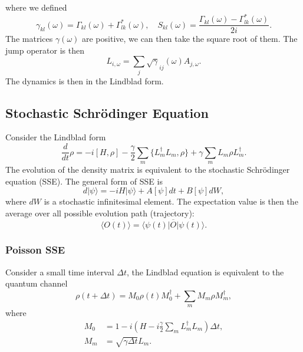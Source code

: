 \documentclass[aps,prb,superscriptaddress,nofootinbib]{revtex4}
\begin{document}
where we defined
\begin{equation}
	\gamma_{kl}(\omega) = \Gamma_{kl}(\omega) +\Gamma^*_{lk}(\omega), \quad
	S_{kl}(\omega) = \frac{\Gamma_{kl}(\omega) - \Gamma^*_{lk}(\omega)}{2i}.
\end{equation}
The matrices $\gamma(\omega)$ are positive, we can then take the square root of them.
The jump operator is then
\begin{equation}
	L_{i,\omega} = \sum_j \sqrt{\gamma}_{ij}(\omega)A_{j,\omega}.
\end{equation}
The dynamics is then in the Lindblad form.


\subsection{Stochastic Schr\"{o}dinger Equation}

Consider the Lindblad form
\begin{equation}
	\frac{d}{dt}\rho = -i[H,\rho] -\frac{\gamma}{2}\sum_m \{L_m^\dagger L_m, \rho\} + \gamma\sum_m L_m\rho L_m^\dagger.
\end{equation}
The evolution of the density matrix is equivalent to the stochastic Schr\"{o}dinger equation (SSE).
The general form of SSE is
\begin{equation}
	d|\psi\rangle = -iH|\psi\rangle + A[\psi]dt + B[\psi]dW,
\end{equation}
where $dW$ is a stochastic infinitesimal element.
The expectation value is then the average over all possible evolution path (trajectory):
\begin{equation}
	\langle O(t) \rangle = \overline{\langle\psi(t)|O|\psi(t)\rangle}.
\end{equation}

\subsubsection{Poisson SSE}
Consider a small time interval $\Delta t$, the Lindblad equation is equivalent to the quantum channel
\begin{equation}
	\rho(t+\Delta t) = M_0 \rho(t) M_0^\dagger + \sum_m M_m \rho M_m^\dagger, 
\end{equation}
where
\begin{equation}
\begin{aligned}
	M_0 &= 1 - i\left(H - i\frac{\gamma}{2} \sum_m L_m^\dagger L_m\right)\Delta t, \\
	M_m &= \sqrt{\gamma\Delta t} L_m.
\end{aligned}
\end{equation}
\end{document}
